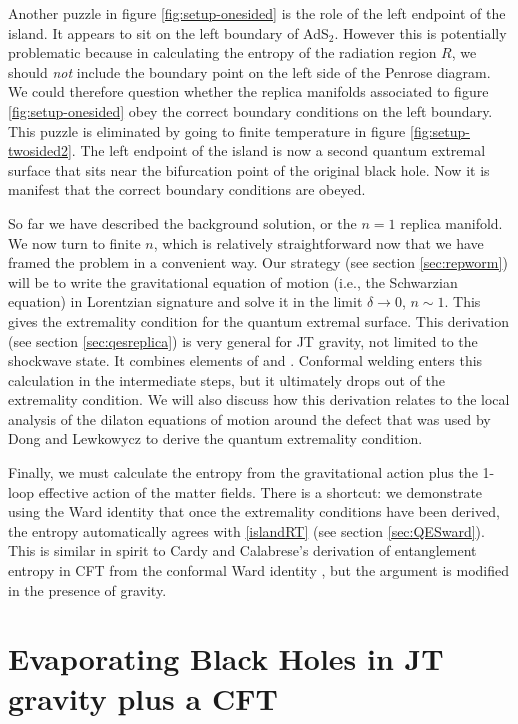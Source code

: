 \documentclass[11pt,oneside,letterpaper]{article}
\numberwithin{equation}{section}
\begin{document}
\begin{spacing}{1.1}
Another puzzle in figure \ref{fig:setup-onesided} is the role of the left endpoint of the island. It appears to sit on the left boundary of AdS$_2$. However this is potentially problematic because in calculating the entropy of the radiation region $R$, we should \textit{not} include the boundary point on the left side of the Penrose diagram. We could therefore question whether the replica manifolds associated to figure \ref{fig:setup-onesided}  obey the correct boundary conditions on the left boundary. This puzzle is eliminated by going to finite temperature in figure \ref{fig:setup-twosided2}. The left endpoint of the island is now a second quantum extremal surface that sits near the bifurcation point of the original black hole. Now it is manifest that the correct boundary conditions are obeyed.



So far we have described the background solution, or the $n=1$ replica manifold. We now turn to finite $n$, which is relatively straightforward now that we have framed the problem in a convenient way. Our strategy (see section \ref{sec:repworm}) will be to write the gravitational equation of motion (i.e., the Schwarzian equation) in Lorentzian signature and solve it in the limit $\delta \to 0$, $n \sim 1$. This gives the extremality condition for the quantum extremal surface. This derivation (see section \ref{sec:qesreplica}) is very general for JT gravity, not limited to the shockwave state. It combines elements of \cite{Almheiri:2019qdq} and \cite{Penington:2019kki}. Conformal welding enters this calculation in the intermediate steps, but it ultimately drops out of the extremality condition. We will also discuss how this derivation relates to the local analysis of the dilaton equations of motion around the defect that was used by Dong and Lewkowycz \cite{Dong:2017xht} to derive the quantum extremality condition. 

Finally, we must calculate the entropy from the gravitational action plus the 1-loop effective action of the matter fields. There is a shortcut: we demonstrate using the Ward identity that once the extremality conditions have been derived, the entropy automatically agrees with \eqref{islandRT} (see section \ref{sec:QESward}). This is similar in spirit to Cardy and Calabrese's derivation of entanglement entropy in CFT from the conformal Ward identity \cite{Calabrese:2004eu}, but the argument is modified in the presence of gravity. 




\section{Evaporating Black Holes in JT  gravity plus a CFT}\label{sec2}


\end{spacing}
\end{document}
